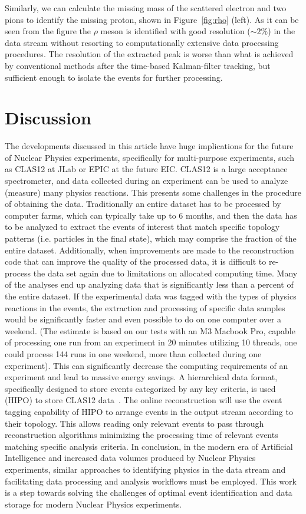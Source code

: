\documentclass[a4paper,11pt]{article}
\begin{document}
Similarly, we can calculate the missing mass of the scattered electron and two pions to identify the missing proton, shown in Figure~\ref{fig:rho} (left). 
As it can be seen from the figure the $\rho$ meson is identified with good resolution ($\sim 2\%$) in the data stream without resorting to computationally extensive data processing procedures. The resolution of the extracted peak is worse than what is achieved by conventional methods after the time-based Kalman-filter tracking, but sufficient enough to isolate the events for further processing. 

\section{Discussion}

The developments discussed in this article have huge implications for the future of Nuclear Physics experiments, specifically for multi-purpose experiments, such as CLAS12 at JLab or EPIC at the future EIC. CLAS12 is a large acceptance spectrometer, and data collected during an experiment can be used to analyze (measure) many physics reactions. This presents some challenges in the procedure of obtaining the data. Traditionally an entire dataset has to be processed by computer farms, which can typically take up to 6 months, and then the data has to be analyzed to extract the events of interest that match specific topology patterns (i.e. particles in the final state), which may comprise the fraction of the entire dataset. Additionally, when improvements are made to the reconstruction code that can improve the quality of the processed data, it is difficult to re-process the data set again due to limitations on allocated computing time. Many of the analyses end up analyzing data that is significantly less than a percent of the entire dataset. If the experimental data was tagged with the types of physics reactions in the events, the extraction and processing of specific data samples would be significantly faster and even possible to do on one computer over a weekend. (The estimate is based on our tests with an M3 Macbook Pro, capable of processing one run from an experiment in 20 minutes utilizing 10 threads, one could process 144 runs in one weekend, more than collected during one experiment). This can significantly decrease the computing requirements of an experiment and lead to massive energy savings.
A hierarchical data format, specifically designed to store events categorized by any key criteria, is used (HIPO) to store CLAS12 data~\cite{Gavalian:hipo}.
The online reconstruction will use the event tagging capability of HIPO to arrange events in the output stream according to their topology. This allows reading only relevant events to pass through reconstruction algorithms minimizing the processing time of relevant events matching specific analysis criteria.
In conclusion, in the modern era of Artificial Intelligence and increased data volumes produced by Nuclear Physics experiments, similar approaches to identifying physics in the data stream and facilitating data processing and analysis workflows must be employed. This work is a step towards solving 
the challenges of optimal event identification and data storage for modern Nuclear Physics experiments.
\end{document}
